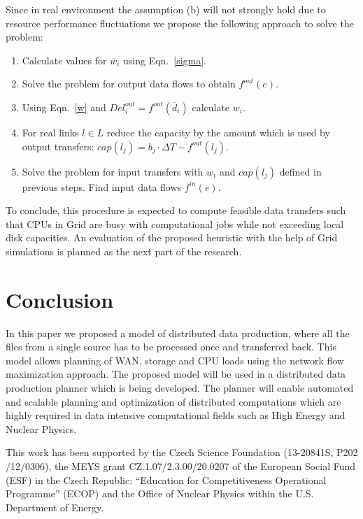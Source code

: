 \documentclass{svjour3}                     %
\begin{document}
Since in real environment the assumption (b) will not strongly hold due to
resource performance fluctuations we propose the following approach to
solve the problem:
%
\begin{enumerate}
\item Calculate values for $\overline{w}_{i}$ using Eqn.~\ref{sigma}.
\item Solve the problem for output data flows to obtain $f^{out}(e)$.
\item Using Eqn.~\ref{w} and $Del_{i}^{out} = f^{out}(\overline{d}_{i})$ calculate $w_{i}$.
\item For real links $l \in L$ reduce the capacity by the amount which is used by output transfers: $cap(l_{j}) = b_{j} \cdot \Delta T - f^{out}(l_{j})$.
\item Solve the problem for input transfers with $w_{i}$ and $cap(l_{j})$ defined in previous steps. Find input data flows $f^{in}(e)$.
\end{enumerate}
%
To conclude, this procedure is expected to compute feasible data transfers 
such that CPUs in Grid are busy with computational jobs while not exceeding 
local disk capacities. An evaluation of the proposed heuristic with the help of Grid simulations is planned as the next part of the research. 

\section{Conclusion}
\label{Conclusion}

In this paper we proposed a model of distributed data production, where all
the files from a single source has to be processed once and transferred back.
This model allows planning of WAN, storage and CPU loads using the network
flow maximization approach. The proposed model will be used in a distributed
data production planner which is being developed. The planner will enable
automated and scalable planning and optimization of distributed computations
which are highly required in data intensive computational fields such as High Energy and Nuclear Physics.

\begin{acknowledgements}
This work has been supported by the Czech Science Foundation
(13-20841S, P202$/$12$/$0306),  the MEYS grant CZ.1.07/2.3.00/20.0207 of the European Social Fund (ESF) in the Czech Republic: “Education for Competitiveness Operational Programme” (ECOP) and the Office of Nuclear Physics within the U.S. Department of Energy.  
\end{acknowledgements}

{}

\end{document}
